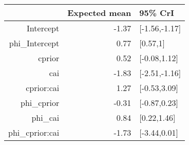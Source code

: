 \begin{tabular}{rrl}
  \hline
 & Expected mean & 95\% CrI \\ 
  \hline
Intercept & -1.37 & [-1.56,-1.17] \\ 
  phi\_Intercept & 0.77 & [0.57,1] \\ 
  cprior & 0.52 & [-0.08,1.12] \\ 
  cai & -1.83 & [-2.51,-1.16] \\ 
  cprior:cai & 1.27 & [-0.53,3.09] \\ 
  phi\_cprior & -0.31 & [-0.87,0.23] \\ 
  phi\_cai & 0.84 & [0.22,1.46] \\ 
  phi\_cprior:cai & -1.73 & [-3.44,0.01] \\ 
   \hline
\end{tabular}

